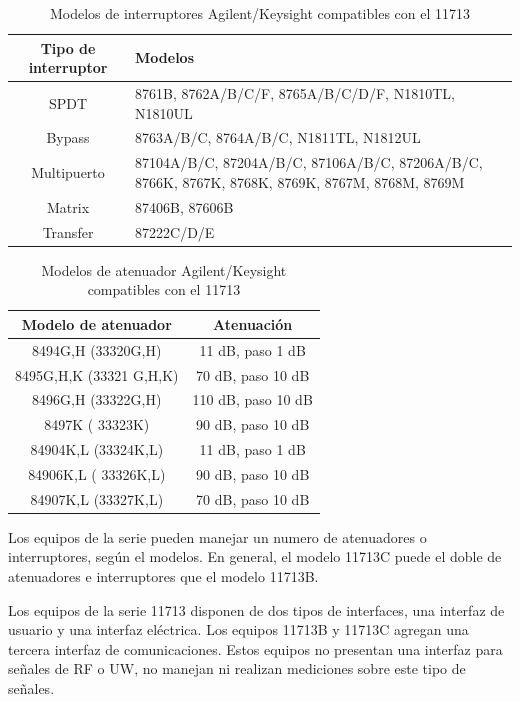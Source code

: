 \begin{table}[h!]
	\centering
	\begin{tabularx}{\textwidth}{cX}
		\toprule
		Tipo de interruptor	&	Modelos \\
		\midrule
		SPDT 				&	8761B, 8762A/B/C/F, 8765A/B/C/D/F, N1810TL, N1810UL \\
		\midrule 
		Bypass				&	8763A/B/C, 8764A/B/C, N1811TL, N1812UL \\
		\midrule			
		Multipuerto			&	87104A/B/C, 87204A/B/C, 87106A/B/C, 87206A/B/C, 8766K, 8767K, 8768K, 8769K, 8767M, 8768M, 8769M \\
		\midrule
		Matrix				&	87406B, 87606B \\
		\midrule
		Transfer			& 	87222C/D/E \\
		\bottomrule
	\end{tabularx}
	\caption{Modelos de interruptores Agilent/Keysight compatibles con el 11713}
	\label{Tab:ModelosInterruptores11713}
\end{table}

\begin{table}[h!]
	\centering
	\begin{tabular}{cc}
		\toprule
		Modelo de atenuador	 	&	Atenuación 			\\		
		\midrule
		8494G,H (33320G,H)		&	11 dB, paso 1 dB	\\
		\midrule
		8495G,H,K (33321 G,H,K)	&	70 dB, paso 10 dB 	 \\
		\midrule
		8496G,H (33322G,H)		&	110 dB, paso 10 dB   \\
		\midrule		
		8497K ( 33323K)			&	90 dB, paso 10 dB 	 \\
		\midrule		
		84904K,L (33324K,L)		&	11 dB, paso 1 dB 	\\
		\midrule		
		84906K,L ( 33326K,L)	& 	90 dB, paso 10 dB 	\\
		\midrule		
		84907K,L (33327K,L) 	& 	70 dB, paso 10 dB 	\\
		\bottomrule		
	\end{tabular}
	\caption{Modelos de atenuador Agilent/Keysight compatibles con el 11713}
	\label{Tab:ModelosAtenuadores11713}
\end{table}
Los equipos de la serie pueden manejar un numero de atenuadores o interruptores, según el modelos. En general, el modelo 11713C puede el doble de atenuadores e interruptores que el modelo 11713B.

Los equipos de la serie 11713 disponen de dos tipos de interfaces, una interfaz de usuario y una interfaz eléctrica. Los equipos 11713B y 11713C agregan una tercera interfaz de comunicaciones. Estos equipos no presentan una interfaz para señales de RF o UW, no manejan ni realizan mediciones sobre este tipo de señales.


